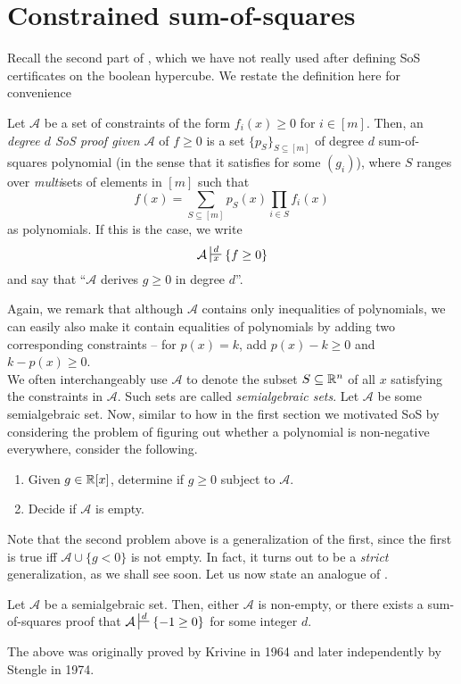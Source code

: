 
\clearpage

\section{Constrained sum-of-squares}
\label{sec:constrained}

Recall the second part of , which we have not really used after defining SoS certificates on the boolean hypercube. We restate the definition here for convenience

\begin{fdef}
	Let $\mathcal{A}$ be a set of constraints of the form $f_i(x) \ge 0$ for $i \in [m]$. Then, an \emph{degree $d$ SoS proof given $\mathcal{A}$} of $f \ge 0$ is a set $\{p_S\}_{S \subseteq [m]}$ of degree $d$ sum-of-squares polynomial (in the sense that it satisfies  for some $(g_i)$), where $S$ ranges over \emph{multi}sets of elements in $[m]$ such that
	\[ f(x) = \sum_{S \subseteq [m]} p_S(x) \prod_{i \in S} f_i(x) \]
	as polynomials. If this is the case, we write
	\[ \mathcal{A} \sststile{x}{d} \{f \ge 0\} \]
	and say that ``$\mathcal{A}$ derives $g \ge 0$ in degree $d$''.
\end{fdef}
Again, we remark that although $\mathcal{A}$ contains only inequalities of polynomials, we can easily also make it contain equalities of polynomials by adding two corresponding constraints -- for $p(x) = k$, add $p(x)-k \ge 0$ and $k-p(x) \ge 0$. \\
We often interchangeably use $\mathcal{A}$ to denote the subset $S \subseteq \mathbb{R}^n$ of all $x$ satisfying the constraints in $\mathcal{A}$. Such sets are called \emph{semialgebraic sets}. Let $\mathcal{A}$ be some semialgebraic set. Now, similar to how in the first section we motivated SoS by considering the problem of figuring out whether a polynomial is non-negative everywhere, consider the following.

\begin{enumerate}
	\item Given $g \in \mathbb{R}[x]$, determine if $g \ge 0$ subject to $\mathcal{A}$.
	\item Decide if $\mathcal{A}$ is empty.
\end{enumerate}

Note that the second problem above is a generalization of the first, since the first is true iff $\mathcal{A} \cup \{g < 0\}$ is not empty. In fact, it turns out to be a \emph{strict} generalization, as we shall see soon. Let us now state an analogue of .

\begin{flem}[Positivstellensatz]
	Let $\mathcal{A}$ be a semialgebraic set. Then, either $\mathcal{A}$ is non-empty, or there exists a sum-of-squares proof that $\mathcal{A} \sststile{}{d} \{-1 \ge 0\}$ for some integer $d$.
\end{flem}

The above was originally proved by Krivine \cite{krivine-positivstellensatz} in 1964 and later independently by Stengle \cite{stengle-positivstellensatz} in 1974.